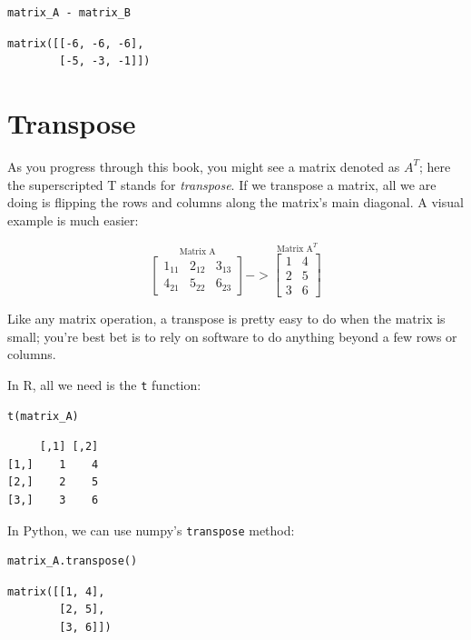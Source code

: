 \documentclass[
  letterpaper,
]{krantz}
\begin{document}
\begin{verbatim}
matrix_A - matrix_B
\end{verbatim}

\begin{verbatim}
matrix([[-6, -6, -6],
        [-5, -3, -1]])
\end{verbatim}

\section{Transpose}\label{transpose}

As you progress through this book, you might see a matrix denoted as
\(A^T\); here the superscripted T stands for \emph{transpose}. If we
transpose a matrix, all we are doing is flipping the rows and columns
along the matrix's main diagonal. A visual example is much easier:

\[
\stackrel{\mbox{Matrix A}}{
\begin{bmatrix}
1_{11} & 2_{12} & 3_{13}\\
4_{21} & 5_{22} & 6_{23}
\end{bmatrix}
}
->
\stackrel{\mbox{Matrix A}^T}{
\begin{bmatrix}
1 & 4 \\
2 & 5 \\
3 & 6
\end{bmatrix}
}
\]

Like any matrix operation, a transpose is pretty easy to do when the
matrix is small; you're best bet is to rely on software to do anything
beyond a few rows or columns.

In R, all we need is the \texttt{t} function:

\begin{verbatim}
t(matrix_A)
\end{verbatim}

\begin{verbatim}
     [,1] [,2]
[1,]    1    4
[2,]    2    5
[3,]    3    6
\end{verbatim}

In Python, we can use numpy's \texttt{transpose} method:

\begin{verbatim}
matrix_A.transpose()
\end{verbatim}

\begin{verbatim}
matrix([[1, 4],
        [2, 5],
        [3, 6]])
\end{verbatim}
\end{document}
